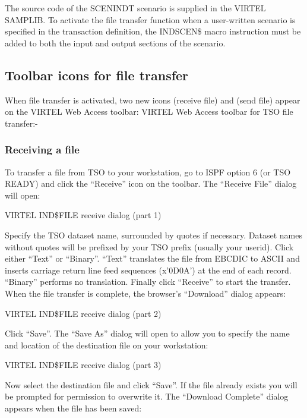 \documentclass[letterpaper,10pt,english]{sphinxmanual}
\begin{document}
The source code of the SCENINDT scenario is supplied in the VIRTEL SAMPLIB.
To activate the file transfer function when a user-written scenario is specified in the transaction definition, the
INDSCEN\$ macro instruction must be added to both the input and output sections of the scenario.


\subsection{Toolbar icons for file transfer}
\label{\detokenize{User_Guide:toolbar-icons-for-file-transfer}}
When file transfer is activated, two new icons (receive file) and (send file) appear on the VIRTEL Web Access toolbar:
VIRTEL Web Access toolbar for TSO file transfer:-



\subsubsection{Receiving a file}
\label{\detokenize{User_Guide:receiving-a-file}}
To transfer a file from TSO to your workstation, go to ISPF option 6 (or TSO READY) and click the “Receive” icon on the
toolbar. The “Receive File” dialog will open:

VIRTEL IND\$FILE receive dialog (part 1)

Specify the TSO dataset name, surrounded by quotes if necessary. Dataset names without quotes will be prefixed by
your TSO prefix (usually your userid). Click either “Text” or “Binary”. “Text” translates the file from EBCDIC to ASCII and
inserts carriage return line feed sequences (x’0D0A’) at the end of each record. “Binary” performs no translation.
Finally click “Receive” to start the transfer.
When the file transfer is complete, the browser’s “Download” dialog appears:

VIRTEL IND\$FILE receive dialog (part 2)

Click “Save”. The “Save As” dialog will open to allow you to specify the name and location of the destination file on
your workstation:

VIRTEL IND\$FILE receive dialog (part 3)

Now select the destination file and click “Save”. If the file already exists you will be prompted for permission to
overwrite it. The “Download Complete” dialog appears when the file has been saved:
\end{document}
